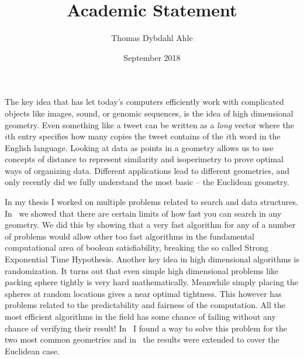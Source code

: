 \documentclass[10pt]{article}
\title{Academic Statement}
\author{Thomas Dybdahl Ahle}
\date{September 2018}
\begin{document}
\maketitle


The key idea that has let today's computers efficiently work with complicated objects like images, sound, or genomic sequences, is the idea of high dimensional geometry.
Even something like a tweet can be written as a \emph{long} vector where the $i$th entry specifies how many copies the tweet contains of the $i$th word in the English language.
Looking at data as points in a geometry allows us to use concepts of distance to represent similarity and isoperimetry to prove optimal ways of organizing data.
Different applications lead to different geometries, and only recently did we fully understand the most basic -- the Euclidean geometry.


In my thesis I worked on multiple problems related to search and data structures.
In~\cite{ahle2016complexity} we showed that there are certain limits of how fast you can search in any geometry.
We did this by showing that a very fast algorithm for any of a number of problems would allow other too fast algorithms in the fundamental computational area of boolean satisfiability, breaking the so called Strong Exponential Time Hypothesis.
%
Another key idea in high dimensional algorithms is randomization.
It turns out that even simple high dimensional problems like packing sphere tightly is very hard mathematically.
Meanwhile simply placing the spheres at random locations gives a near optimal tightness.
This however has problems related to the predictability and fairness of the computation.
All the most efficient algorithms in the field has some chance of failing without any chance of verifying their result!
In~\cite{ahle2017optimal} I found a way to solve this problem for the two most common geometries and in~\cite{wei2018optimal} the results were extended to cover the Euclidean case.
\end{document}
